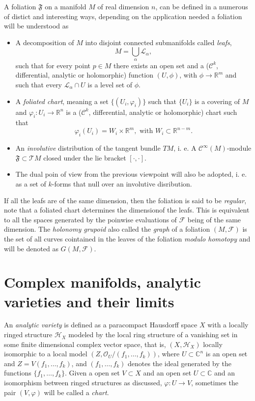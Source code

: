 \documentclass[letterpaper]{book}
\newcommand{\co}{\ensuremath{\mathbb C }}
\newcommand{\con}{\ensuremath{\mathbb{C}^n}}
\newcommand{\re}{\ensuremath{\mathbb R }}
\begin{document}
A foliation $\mathfrak{F}$ on a manifold $M$ of real dimension $n$, can be defined in a numerous of distict and interesting ways, depending on the application needed a foliation will be understood as
\begin{itemize}
  \item A decomposition of $M$ into disjoint connected submanifolds called \emph{leafs},
        \[
          M=\bigcup_{\alpha}\mathcal{L_{\alpha}},
        \]
        \noindent such that for every point $p\in M$ there exists an open set and a ($\mathcal{C}^{k}$, differential, analytic or holomorphic) function $(U,\phi)$, with $\phi\rightarrow\re^{m}$ and such that every $\mathcal{L}_{\alpha}\cap U$ is a level set of $\phi$.
  \item A \emph{foliated chart}, meaning a set $\{(U_{i},\varphi_{i})\}$ such that $\{U_{i}\}$ is a covering of $M$ and $\varphi_{i}:U_{i}\rightarrow\re^{n}$ is a ($\mathcal{C}^{k}$, differential, analytic or holomorphic) chart such that
        \[
          \varphi_{i}(U_{i})=W_{i}\times\re^{m},\text{ with }W_{i}\subset\re^{n-m}.
        \]
  \item An \emph{involutive} distribution of the tangent bundle $TM$, i. e. A $\mathcal{C}^{\infty}(M)$-module $\mathfrak{F}\subset\mathcal{T}M$ closed under the lie bracket $[\cdot,\cdot]$.
  \item The dual poin of view from the previous viewpoint will also be adopted, i. e. as a set of $k$-forms that null over an involutive disribution.
\end{itemize}
If all the leafs are of the same dimension, then the foliation is said to be \emph{regular}, note that a foliated chart determines the dimensionof the leafs. This is equivalent to all the spaces generated by the poinwise evaluations of $\mathcal{F}$ being of the same dimension.
The \emph{holonomy grupoid} also called the \emph{graph} of a foliation $(M,\mathcal{F})$ is the set of all curves cointained in the leaves of the foliation \textit{modulo homotopy} and will be denoted as $G(M,\mathcal{F})$.

\section{Complex manifolds, analytic varieties and their limits}
An \emph{analytic variety} is defined as a paracompact Hausdorff space $X$ with a locally ringed structure $\mathcal{H}_{X}$ modeled by the local ring structure of
a vanishing set in some finite dimensional complex vector space, that is, $(X,\mathcal{H}_{X})$ locally isomorphic to a local model $(Z,\mathcal{O}_{U}/(f_{1},\dots,f_{k}))$, where $U\subset\con$ is an open set and $Z=V(f_{1},\dots,f_{k})$, and $(f_{1},\dots,f_{k})$ denotes the ideal generated by the functions $\{f_{1},\dots,f_{k}\}$. Given a open set $V\subset X$ and an open set $U\subset\co$ and an isomorphism between ringed structures as discussed, $\varphi:U\rightarrow V$, sometimes the pair $(V,\varphi)$ will be called a \emph{chart}.
\end{document}
